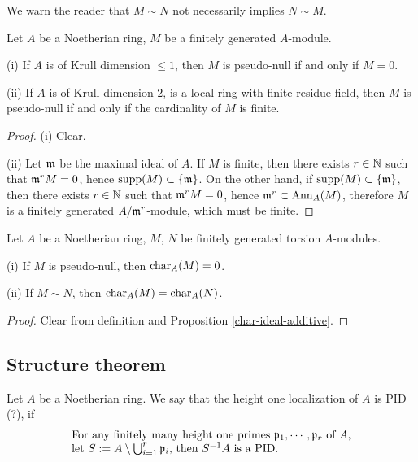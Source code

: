 \begin{remark}
We warn the reader that $M\sim N$ not necessarily implies $N\sim M$.
\end{remark}

\begin{prop}
\label{pseudo-null-criterion}
\leanok
Let $A$ be a Noetherian ring, $M$ be a finitely generated $A$-module.

{\rm(i)} If $A$ is of Krull dimension $\leq 1$, then $M$ is pseudo-null
if and only if $M=0$.

{\rm(ii)} If $A$ is of Krull dimension $2$,
is a local ring with finite residue field, then $M$ is pseudo-null
if and only if the cardinality of $M$ is finite.
\end{prop}

\begin{proof}
\leanok
(i) Clear.

(ii) Let ${\mathfrak{m}}$ be the maximal ideal of $A$.
If $M$ is finite, then there exists $r\in{\mathbb {N}}$
such that ${\mathfrak{m}}^rM=0$, hence ${\mathrm{supp}}(M)\subset\{{\mathfrak{m}}\}$.
On the other hand, if ${\mathrm{supp}}(M)\subset\{{\mathfrak{m}}\}$,
then there exists $r\in{\mathbb {N}}$
such that ${\mathfrak{m}}^rM=0$, hence ${\mathfrak{m}}^r\subset{\mathrm{Ann}}_A(M)$, therefore
$M$ is a finitely generated $A/{\mathfrak{m}}^r$-module, which must be finite.
\end{proof}

\begin{prop}
\label{pseudo-null-char-ideal}
\leanok
Let $A$ be a Noetherian ring, $M$, $N$ be finitely generated torsion $A$-modules.

{\rm(i)} If $M$ is pseudo-null, then $\operatorname{char}_A(M)=0$.

{\rm(ii)} If $M\sim N$, then $\operatorname{char}_A(M)=\operatorname{char}_A(N)$.
\end{prop}

\begin{proof}
\leanok
Clear from definition and Proposition \ref{char-ideal-additive}.
\end{proof}

\subsection{Structure theorem}

\begin{definition}
\label{ht-1-localization-is-PID}
\leanok
Let $A$ be a Noetherian ring.
We say that the height one localization of $A$ is PID (?), if
\begin{equation}
\label{eqn:ht-1-localization-is-PID}
\begin{array}{l}
\text{For any finitely many height one primes ${\mathfrak{p}}_1,\cdots,{\mathfrak{p}}_r$ of $A$,}\\
\text{let $S:=A\setminus\bigcup_{i=1}^r{\mathfrak{p}}_i$, then $S^{-1}A$ is a PID.}
\end{array}
\end{equation}
\end{definition}

